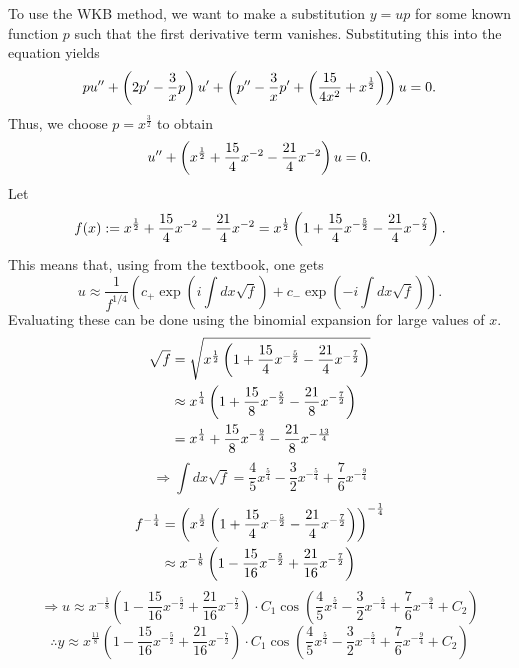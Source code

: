 \item
To use the WKB method, we want to make a substitution $y = up$ for some known function $p$ such that the first derivative term vanishes.
Substituting this into the equation yields
\[
	pu'' + \left( 2p' - \frac{3}{x}p \right)u' + \left( p'' - \frac{3}{x}p' + \left( \frac{15}{4x^2} + x^{\frac{1}{2}} \right) \right)u = 0.
\]
Thus, we choose $p = x^{\frac{3}{2}}$ to obtain
\[
	u'' + \left( x^{\frac{1}{2}} + \frac{15}{4}x^{-2} - \frac{21}{4}x^{-2} \right) u = 0.
\]
Let
\[
	f(x) := x^{\frac{1}{2}} + \frac{15}{4}x^{-2} - \frac{21}{4}x^{-2} = x^{\frac{1}{2}} \left( 1 + \frac{15}{4}x^{-\frac{5}{2}} - \frac{21}{4}x^{-\frac{7}{2}} \right).
\]
This means that, using  from the textbook, one gets
\[
	u \approx \frac{1}{f^{1/4}} \left( c_+ \exp\left( i\int dx \sqrt{f} \right) + c_- \exp\left( -i\int dx \sqrt{f} \right) \right).
\]
Evaluating these can be done using the binomial expansion for large values of $x$.
\begin{align*}
	\sqrt{f}
	 & = \sqrt{x^{\frac{1}{2}} \left( 1 + \frac{15}{4}x^{-\frac{5}{2}} - \frac{21}{4}x^{-\frac{7}{2}} \right)}        \\
	 & \approx x^{\frac{1}{4}} \left( 1 + \frac{15}{8}x^{-\frac{5}{2}} - \frac{21}{8}x^{-\frac{7}{2}} \right) \\
	 & = x^{\frac{1}{4}} + \frac{15}{8}x^{-\frac{9}{4}} - \frac{21}{8}x^{-\frac{13}{4}}
\end{align*}
\[
	\Rightarrow \int dx \sqrt{f}
	= \frac{4}{5}x^{\frac{5}{4}} - \frac{3}{2} x^{-\frac{5}{4}} + \frac{7}{6}x^{-\frac{9}{4}}
\]
\begin{align*}
	f^{-\frac{1}{4}}
	 & = {\left( x^{\frac{1}{2}} \left( 1 + \frac{15}{4}x^{-\frac{5}{2}} - \frac{21}{4}x^{-\frac{7}{2}} \right) \right)}^{-\frac{1}{4}} \\
	 & \approx x^{-\frac{1}{8}} \left( 1 - \frac{15}{16}x^{-\frac{5}{2}} + \frac{21}{16}x^{-\frac{7}{2}} \right)
\end{align*}
\[
	\Rightarrow u
	\approx x^{-\frac{1}{8}} \left( 1 - \frac{15}{16}x^{-\frac{5}{2}} + \frac{21}{16}x^{-\frac{7}{2}} \right)
	\cdot C_1 \cos\left( \frac{4}{5}x^{\frac{5}{4}} - \frac{3}{2} x^{-\frac{5}{4}} + \frac{7}{6}x^{-\frac{9}{4}} + C_2 \right)
\]
\[
	\therefore y
	\approx x^{\frac{11}{8}} \left( 1 - \frac{15}{16}x^{-\frac{5}{2}} + \frac{21}{16}x^{-\frac{7}{2}} \right)
	\cdot C_1 \cos\left( \frac{4}{5}x^{\frac{5}{4}} - \frac{3}{2} x^{-\frac{5}{4}} + \frac{7}{6}x^{-\frac{9}{4}} + C_2 \right)
\]
